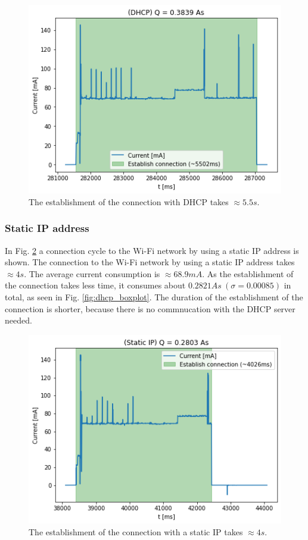 \begin{figure}[H]
    \centering
    \includegraphics[width =\linewidth]{fig/dhcp.png}
    \caption{The establishment of the connection with DHCP takes $\approx 5.5s$.}
    \label{fig:dhcp}
\end{figure}

\subsubsection{Static IP address}
In Fig. \ref{fig:static_ip} a connection cycle to the Wi-Fi network by using a static IP address is shown.
The connection to the Wi-Fi network by using a static IP address takes $\approx 4 s$.
The average current consumption is $\approx 68.9 mA$.
As the establishment of the connection takes less time, it consumes about $0.2821 As\ (\sigma = 0.00085)$  in total, as seen in Fig. \ref{fig:dhcp_boxplot}.
The duration of the establishment of the connection is shorter, because there is no commnucation with the DHCP server needed.

\begin{figure}[H]
    \centering
    \includegraphics[width =\linewidth]{fig/static_ip.png}
    \caption{The establishment of the connection with a static IP takes $\approx 4s$.}
    \label{fig:static_ip}
\end{figure}

